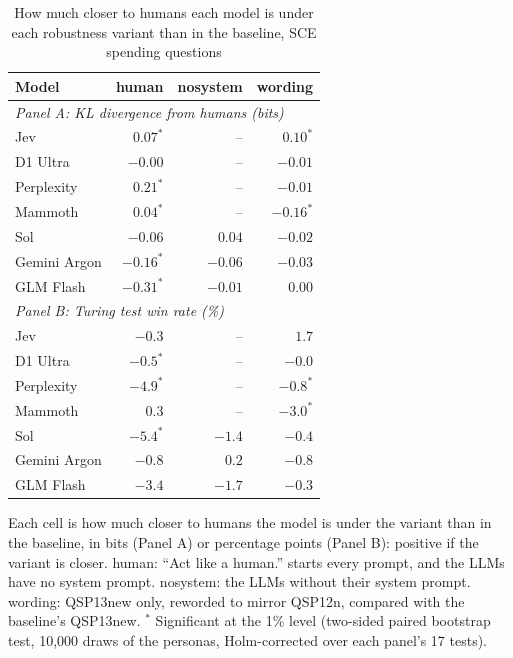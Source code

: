 \begin{table}[htbp]
\centering
\caption{How much closer to humans each model is under each robustness variant than in the baseline, SCE spending questions}
\label{tab:sce_robustness}
\begin{tabular}{lrrr}
\toprule
Model & human & nosystem & wording \\
\midrule
\multicolumn{4}{l}{\textit{Panel A: KL divergence from humans (bits)}} \\
\midrule
Jev & $0.07^{*}$ & -- & $0.10^{*}$ \\
D1 Ultra & $-0.00$ & -- & $-0.01$ \\
Perplexity & $0.21^{*}$ & -- & $-0.01$ \\
Mammoth & $0.04^{*}$ & -- & $-0.16^{*}$ \\
Sol & $-0.06$ & $0.04$ & $-0.02$ \\
Gemini Argon & $-0.16^{*}$ & $-0.06$ & $-0.03$ \\
GLM Flash & $-0.31^{*}$ & $-0.01$ & $0.00$ \\
\midrule
\multicolumn{4}{l}{\textit{Panel B: Turing test win rate (\%)}} \\
\midrule
Jev & $-0.3$ & -- & $1.7$ \\
D1 Ultra & $-0.5^{*}$ & -- & $-0.0$ \\
Perplexity & $-4.9^{*}$ & -- & $-0.8^{*}$ \\
Mammoth & $0.3$ & -- & $-3.0^{*}$ \\
Sol & $-5.4^{*}$ & $-1.4$ & $-0.4$ \\
Gemini Argon & $-0.8$ & $0.2$ & $-0.8$ \\
GLM Flash & $-3.4$ & $-1.7$ & $-0.3$ \\
\bottomrule
\end{tabular}
\par\smallskip
\parbox{\linewidth}{\footnotesize Each cell is how much closer to humans the model is under the variant than in the baseline, in bits (Panel A) or percentage points (Panel B): positive if the variant is closer. human: ``Act like a human.'' starts every prompt, and the LLMs have no system prompt. nosystem: the LLMs without their system prompt. wording: QSP13new only, reworded to mirror QSP12n, compared with the baseline's QSP13new. $^{*}$ Significant at the 1\% level (two-sided paired bootstrap test, 10,000 draws of the personas, Holm-corrected over each panel's 17 tests).}
\end{table}
